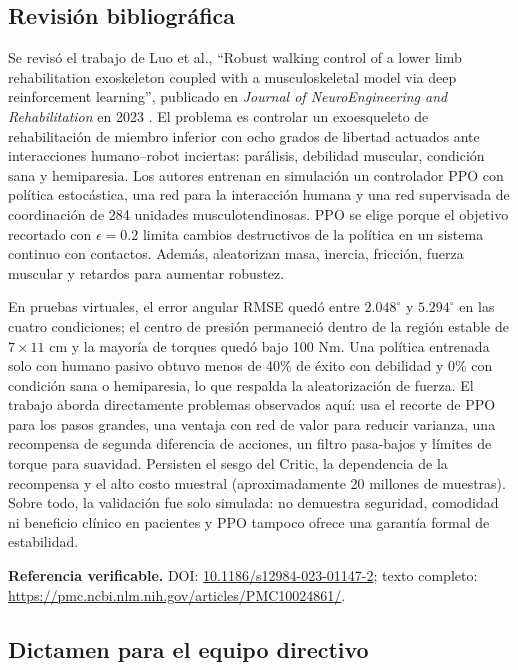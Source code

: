 \documentclass[11pt,letterpaper]{article}
\newcommand{\lead}[1]{\textbf{#1}}
\begin{document}
\subsection{Revisión bibliográfica}

\begin{respuesta}
Se revisó el trabajo de Luo et al., \enquote{Robust walking control of a lower limb
rehabilitation exoskeleton coupled with a musculoskeletal model via deep reinforcement
learning}, publicado en \emph{Journal of NeuroEngineering and Rehabilitation} en 2023
\cite{luo2023}. El problema es controlar un exoesqueleto de rehabilitación de miembro
inferior con ocho grados de libertad actuados ante interacciones humano--robot inciertas:
parálisis, debilidad muscular, condición sana y hemiparesia. Los autores entrenan en
simulación un controlador PPO con política estocástica, una red para la interacción
humana y una red supervisada de coordinación de 284 unidades musculotendinosas. PPO se
elige porque el objetivo recortado con $\epsilon=0.2$ limita cambios destructivos de la
política en un sistema continuo con contactos. Además, aleatorizan masa, inercia,
fricción, fuerza muscular y retardos para aumentar robustez.

En pruebas virtuales, el error angular RMSE quedó entre $2.048^\circ$ y $5.294^\circ$ en
las cuatro condiciones; el centro de presión permaneció dentro de la región estable de
$7\times11$ cm y la mayoría de torques quedó bajo 100 Nm. Una política entrenada solo
con humano pasivo obtuvo menos de 40\% de éxito con debilidad y 0\% con condición sana o
hemiparesia, lo que respalda la aleatorización de fuerza. El trabajo aborda directamente
problemas observados aquí: usa el recorte de PPO para los pasos grandes, una ventaja con
red de valor para reducir varianza, una recompensa de segunda diferencia de acciones,
un filtro pasa-bajos y límites de torque para suavidad. Persisten el sesgo del Critic, la
dependencia de la recompensa y el alto costo muestral (aproximadamente 20 millones de
muestras). Sobre todo, la validación fue solo simulada: no demuestra seguridad,
comodidad ni beneficio clínico en pacientes y PPO tampoco ofrece una garantía formal de
estabilidad.

\medskip
\lead{Referencia verificable.} DOI:
\href{https://doi.org/10.1186/s12984-023-01147-2}{10.1186/s12984-023-01147-2}; texto
completo: \url{https://pmc.ncbi.nlm.nih.gov/articles/PMC10024861/}.
\end{respuesta}

\subsection{Dictamen para el equipo directivo}
\end{document}
